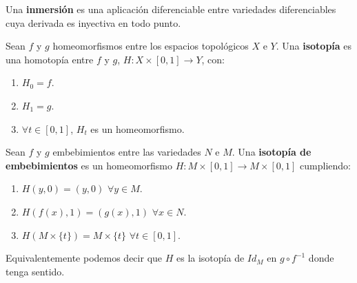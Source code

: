 \begin{definicion} Una \textbf{inmersión} es una aplicación diferenciable entre variedades diferenciables cuya derivada es inyectiva en todo punto.
\end{definicion}

\begin{definicion} Sean $f$ y $g$ homeomorfismos entre los espacios topológicos $X$ e $Y$. Una \textbf{isotopía} es una homotopía entre $f$ y $g$, $H: X \times [0,1] \rightarrow Y$, con:
	\begin{enumerate}
		\item $H_0 = f$.
		\item $H_1 = g$.
		\item $\forall t \in [0,1]$, $H_t$ es un homeomorfismo.
	\end{enumerate}
\end{definicion}

\begin{definicion} Sean $f$ y $g$ embebimientos entre las variedades $N$ e $M$. Una \textbf{isotopía de embebimientos} es un homeomorfismo $H: M \times [0,1] \rightarrow M \times [0,1]$ cumpliendo:
	\begin{enumerate}
		\item $H(y, 0) = (y, 0)$ $\forall y \in M$.
		\item $H(f(x), 1) = (g(x), 1)$ $\forall x \in N$.
		\item $H(M \times \{t\}) = M \times \{t\}$ $\forall t \in [0,1]$.
	\end{enumerate}
	
	Equivalentemente podemos decir que $H$ es la isotopía de $Id_M$ en $g \circ f^{-1}$ donde tenga sentido.
\end{definicion}


\endinput

